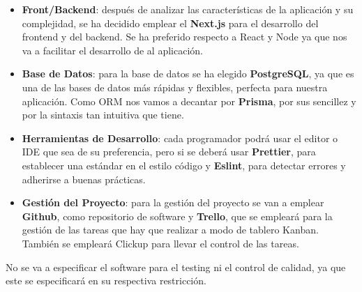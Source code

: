\begin{itemize}
	\item \textbf{Front/Backend}: después de analizar las características de la aplicación y su complejidad, se ha decidido emplear
	el \textbf{Next.js} para el desarrollo del frontend y del backend. Se ha preferido respecto a React y Node ya que nos va a 
	facilitar el desarrollo de al aplicación.
	
	\item \textbf{Base de Datos}: para la base de datos se ha elegido \textbf{PostgreSQL}, ya que es una de las bases de datos más
	rápidas y flexibles, perfecta para nuestra aplicación. Como ORM nos vamos a decantar por \textbf{Prisma}, por sus sencillez y 
	por la sintaxis tan intuitiva que tiene.
	
	\item \textbf{Herramientas de Desarrollo}: cada programador podrá usar el editor o IDE que sea de su preferencia, pero si se deberá usar \textbf{Prettier}, para establecer una estándar en el estilo código y \textbf{Eslint}, para detectar errores y adherirse a buenas prácticas.	
	
	\item \textbf{Gestión del Proyecto}: para la gestión del proyecto se van a emplear \textbf{Github}, como repositorio de software y \textbf{Trello}, que se empleará para la gestión de las tareas que hay que realizar a modo de tablero Kanban. 
	También se empleará Clickup para llevar el control de las tareas.
\end{itemize}

No se va a especificar el software para el testing ni el control de calidad, ya que este se especificará en su respectiva restricción.
 

